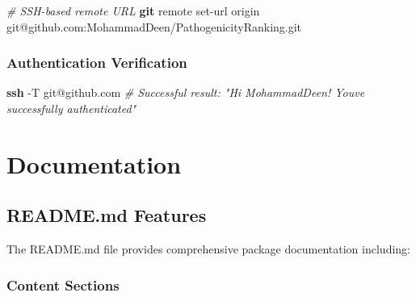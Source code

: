 \documentclass[
  11pt,
]{article}
\newenvironment{Shaded}{\begin{snugshade}}{\end{snugshade}}
\newcommand{\AttributeTok}[1]{\textcolor[rgb]{0.13,0.29,0.53}{#1}}
\newcommand{\CommentTok}[1]{\textcolor[rgb]{0.56,0.35,0.01}{\textit{#1}}}
\newcommand{\FunctionTok}[1]{\textcolor[rgb]{0.13,0.29,0.53}{\textbf{#1}}}
\newcommand{\NormalTok}[1]{#1}
\begin{document}
\begin{Shaded}
\begin{Highlighting}[]
\CommentTok{\# SSH{-}based remote URL}
\FunctionTok{git}\NormalTok{ remote set{-}url origin git@github.com:MohammadDeen/PathogenicityRanking.git}
\end{Highlighting}
\end{Shaded}

\subsubsection{Authentication
Verification}\label{authentication-verification}

\begin{Shaded}
\begin{Highlighting}[]
\FunctionTok{ssh} \AttributeTok{{-}T}\NormalTok{ git@github.com}
\CommentTok{\# Successful result: "Hi MohammadDeen! You\textquotesingle{}ve successfully authenticated"}
\end{Highlighting}
\end{Shaded}

\newpage

\section{Documentation}\label{documentation}

\subsection{README.md Features}\label{readme.md-features}

The README.md file provides comprehensive package documentation
including:

\subsubsection{Content Sections}\label{content-sections}
\end{document}
